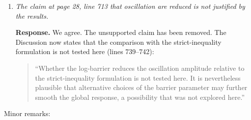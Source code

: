 \documentclass[10pt]{article}
\begin{document}
\begin{enumerate}
\color{black}
\item \textit{The claim at page 28, line 713 that oscillation are reduced is not justified by the results.}

\color{blue}
\textbf{Response.} We agree. The unsupported claim has been removed. The Discussion now states that the comparison with the strict-inequality formulation is not tested here (lines 739--742):

\begin{quote}
	``Whether the log-barrier reduces the oscillation amplitude relative to the strict-inequality formulation is not tested here. It is nevertheless plausible that alternative choices of the barrier parameter may further smooth the global response, a possibility that was not explored here.''
\end{quote}


\end{enumerate}

Minor remarks:
\end{document}

